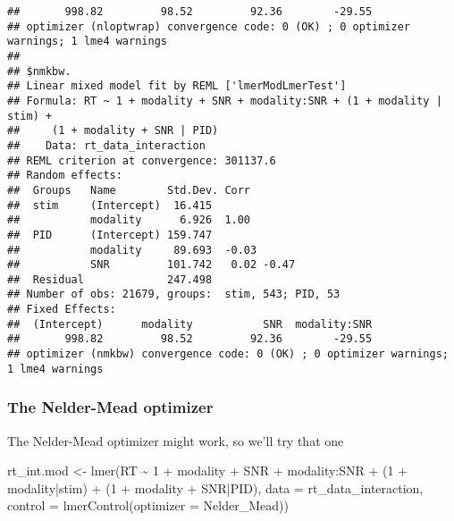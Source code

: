\documentclass[
]{article}
\newenvironment{Shaded}{\begin{snugshade}}{\end{snugshade}}
\newcommand{\AttributeTok}[1]{\textcolor[rgb]{0.77,0.63,0.00}{#1}}
\newcommand{\DecValTok}[1]{\textcolor[rgb]{0.00,0.00,0.81}{#1}}
\newcommand{\FunctionTok}[1]{\textcolor[rgb]{0.00,0.00,0.00}{#1}}
\newcommand{\NormalTok}[1]{#1}
\newcommand{\OtherTok}[1]{\textcolor[rgb]{0.56,0.35,0.01}{#1}}
\newcommand{\SpecialCharTok}[1]{\textcolor[rgb]{0.00,0.00,0.00}{#1}}
\newcommand{\StringTok}[1]{\textcolor[rgb]{0.31,0.60,0.02}{#1}}
\begin{document}
\begin{verbatim}
##       998.82         98.52         92.36        -29.55  
## optimizer (nloptwrap) convergence code: 0 (OK) ; 0 optimizer warnings; 1 lme4 warnings 
## 
## $nmkbw.
## Linear mixed model fit by REML ['lmerModLmerTest']
## Formula: RT ~ 1 + modality + SNR + modality:SNR + (1 + modality | stim) +  
##     (1 + modality + SNR | PID)
##    Data: rt_data_interaction
## REML criterion at convergence: 301137.6
## Random effects:
##  Groups   Name        Std.Dev. Corr       
##  stim     (Intercept)  16.415             
##           modality      6.926  1.00       
##  PID      (Intercept) 159.747             
##           modality     89.693  -0.03      
##           SNR         101.742   0.02 -0.47
##  Residual             247.498             
## Number of obs: 21679, groups:  stim, 543; PID, 53
## Fixed Effects:
##  (Intercept)      modality           SNR  modality:SNR  
##       998.82         98.52         92.36        -29.55  
## optimizer (nmkbw) convergence code: 0 (OK) ; 0 optimizer warnings; 1 lme4 warnings
\end{verbatim}

\hypertarget{the-nelder-mead-optimizer}{%
\subsubsection{The Nelder-Mead
optimizer}\label{the-nelder-mead-optimizer}}

The Nelder-Mead optimizer might work, so we'll try that one

\begin{Shaded}
\begin{Highlighting}[]
\NormalTok{rt\_int.mod }\OtherTok{\textless{}{-}} \FunctionTok{lmer}\NormalTok{(RT }\SpecialCharTok{\textasciitilde{}} \DecValTok{1} \SpecialCharTok{+}\NormalTok{ modality }\SpecialCharTok{+}\NormalTok{ SNR }\SpecialCharTok{+}\NormalTok{ modality}\SpecialCharTok{:}\NormalTok{SNR }\SpecialCharTok{+}
\NormalTok{                     (}\DecValTok{1} \SpecialCharTok{+}\NormalTok{ modality}\SpecialCharTok{|}\NormalTok{stim) }\SpecialCharTok{+}\NormalTok{ (}\DecValTok{1} \SpecialCharTok{+}\NormalTok{ modality }\SpecialCharTok{+}\NormalTok{ SNR}\SpecialCharTok{|}\NormalTok{PID), }
                   \AttributeTok{data =}\NormalTok{ rt\_data\_interaction,}
                   \AttributeTok{control =} \FunctionTok{lmerControl}\NormalTok{(}\AttributeTok{optimizer =} \StringTok{\textquotesingle{}Nelder\_Mead\textquotesingle{}}\NormalTok{))}
\end{Highlighting}
\end{Shaded}
\end{document}
